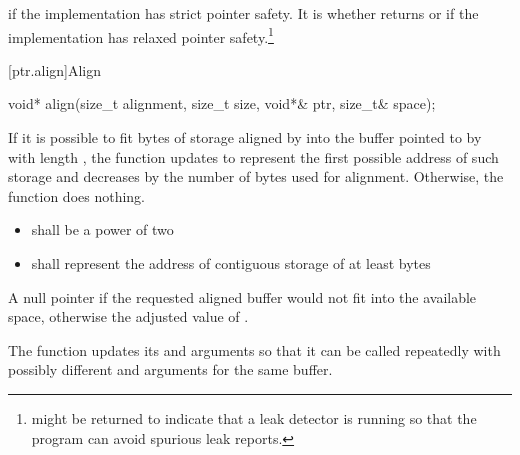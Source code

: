 \begin{itemdescr}
\pnum
\returns {} if the implementation has strict pointer
safety. It is
whether
 returns  or
 if the implementation has relaxed pointer
safety.\footnote{ might be returned to indicate
that a leak detector is running so that the program can avoid spurious leak
reports.}
\end{itemdescr}


[ptr.align]{Align}

%
\begin{itemdecl}
void* align(size_t alignment, size_t size, void*& ptr, size_t& space);
\end{itemdecl}

\begin{itemdescr}
\pnum
\effects If it is possible to fit  bytes
of storage aligned by  into the buffer pointed to by
 with length , the function updates
 to represent the first possible address of such storage
and decreases  by the number of bytes used for alignment.
Otherwise, the function does nothing.

\pnum
\requires

\begin{itemize}
\item {} shall be a power of two

\item {} shall represent the address of contiguous storage of at least
 bytes
\end{itemize}

\pnum
\returns A null pointer if the requested aligned buffer
would not fit into the available space, otherwise the adjusted value
of .

\pnum
\begin{note} The function updates its 
and  arguments so that it can be called repeatedly
with possibly different  and 
arguments for the same buffer.  \end{note}
\end{itemdescr}

